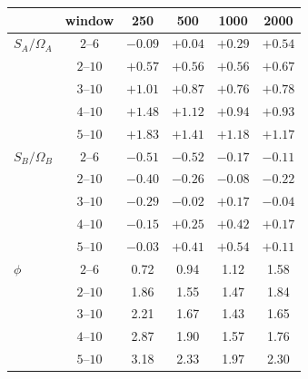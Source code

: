 \begin{tabular}{lccccc}
 & window & 250 & 500 & 1000 & 2000 \\
\hline
$S_A/\Omega_A$ & $2$--$6$ & $-0.09$ & $+0.04$ & $+0.29$ & $+0.54$ \\
 & $2$--$10$ & $+0.57$ & $+0.56$ & $+0.56$ & $+0.67$ \\
 & $3$--$10$ & $+1.01$ & $+0.87$ & $+0.76$ & $+0.78$ \\
 & $4$--$10$ & $+1.48$ & $+1.12$ & $+0.94$ & $+0.93$ \\
 & $5$--$10$ & $+1.83$ & $+1.41$ & $+1.18$ & $+1.17$ \\
$S_B/\Omega_B$ & $2$--$6$ & $-0.51$ & $-0.52$ & $-0.17$ & $-0.11$ \\
 & $2$--$10$ & $-0.40$ & $-0.26$ & $-0.08$ & $-0.22$ \\
 & $3$--$10$ & $-0.29$ & $-0.02$ & $+0.17$ & $-0.04$ \\
 & $4$--$10$ & $-0.15$ & $+0.25$ & $+0.42$ & $+0.17$ \\
 & $5$--$10$ & $-0.03$ & $+0.41$ & $+0.54$ & $+0.11$ \\
$\phi$ & $2$--$6$ & 0.72 & 0.94 & 1.12 & 1.58 \\
 & $2$--$10$ & 1.86 & 1.55 & 1.47 & 1.84 \\
 & $3$--$10$ & 2.21 & 1.67 & 1.43 & 1.65 \\
 & $4$--$10$ & 2.87 & 1.90 & 1.57 & 1.76 \\
 & $5$--$10$ & 3.18 & 2.33 & 1.97 & 2.30 \\
\end{tabular}
